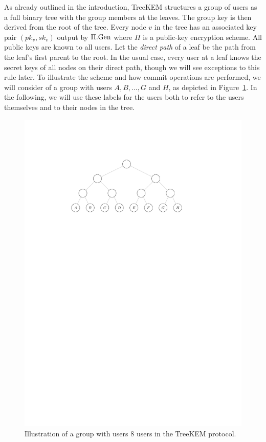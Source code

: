As already outlined in the introduction, TreeKEM structures a group of users as a full binary tree with the group members at the leaves. The group key is then derived from the root of the tree. Every node $v$ in the tree has an associated key pair $(pk_v, sk_v)$ output by $\Pi.\mathrm{Gen}$ where $\Pi$ is a public-key encryption scheme. All public keys are known to all users. Let the \emph{direct path} of a leaf be the path from the leaf's first parent to the root. In the usual case, every user at a leaf knows the secret keys of all nodes on their direct path, though we will see exceptions to this rule later. To illustrate the scheme and how commit operations are performed, we will consider of a group with users $A, B, \ldots, G$ and $H$, as depicted in Figure~\ref{fig:treekem-tree}. In the following, we will use these labels for the users both to refer to the users themselves and to their nodes in the tree.

\begin{figure}
	\begin{center}
		\includegraphics{figures/treekem-tree}
	\end{center}
	\caption{Illustration of a group with users 8 users in the TreeKEM protocol.}\label{fig:treekem-tree}
\end{figure}

